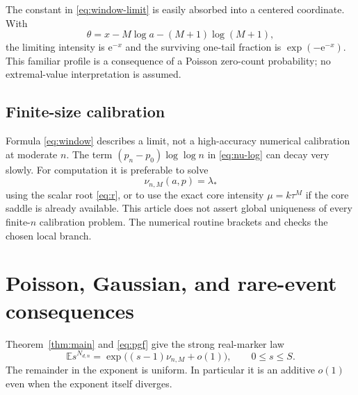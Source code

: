 \documentclass[11pt,a4paper]{article}
\numberwithin{equation}{section}
\theoremstyle{definition}
\theoremstyle{remark}
\newcommand{\ee}{\mathrm e}\newcommand{\dd}{\mathrm d}
\newcommand{\E}{\mathbb E}\newcommand{\Prob}{\mathbb P}
\begin{document}
The constant in \eqref{eq:window-limit} is easily absorbed into a centered
coordinate. With
\[
 \theta=x-M\log a-(M+1)\log(M+1),
\]
the limiting intensity is $\ee^{-x}$ and the surviving one-tail fraction is
$\exp(-\ee^{-x})$. This familiar profile is a consequence of a Poisson
zero-count probability; no extremal-value interpretation is assumed.

\subsection{Finite-size calibration}
Formula \eqref{eq:window} describes a limit, not a high-accuracy numerical
calibration at moderate $n$. The term
$(p_n-p_0)\log\log n$ in \eqref{eq:nu-log} can decay very slowly.
For computation it is preferable to solve
\begin{equation}
 \nu_{n,M}(a,p)=\lambda_*
 \label{eq:calibration}
\end{equation}
using the scalar root \eqref{eq:r}, or to use the exact core intensity
$\mu=k\tau^M$ if the core saddle is already available. This article does
not assert global uniqueness of every finite-$n$ calibration problem.
The numerical routine brackets and checks the chosen local branch.

\section{Poisson, Gaussian, and rare-event consequences}
\label{sec:probability}
Theorem~\ref{thm:main} and \eqref{eq:pgf} give the strong real-marker law
\begin{equation}
 \boxed{\qquad
 \E s^{N_{d,n}}=
 \exp\bigl((s-1)\nu_{n,M}+o(1)\bigr),
 \qquad 0\le s\le S.
 \qquad}
 \label{eq:real-pgf}
\end{equation}
The remainder in the exponent is uniform. In particular it is an additive
$o(1)$ even when the exponent itself diverges.
\end{document}

